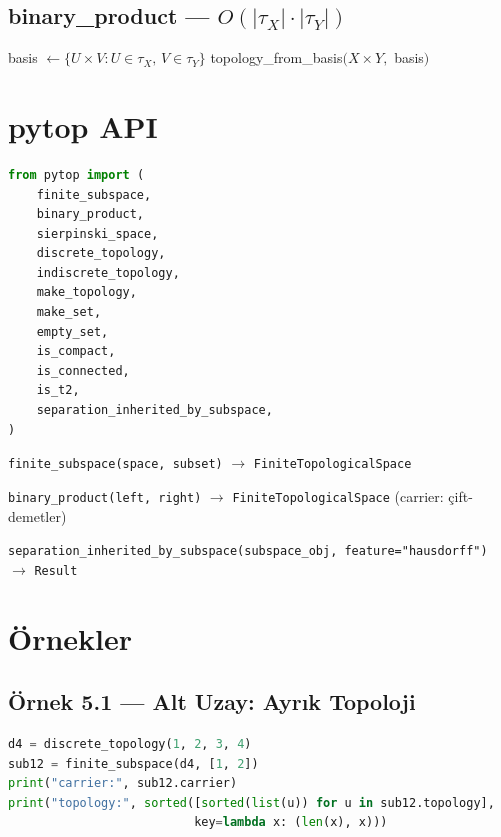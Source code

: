 \subsection{binary\_product — $O(|\tau_X| \cdot |\tau_Y|)$}

\begin{algorithm}
\caption{Product$(X, \tau_X, Y, \tau_Y)$}
\begin{algorithmic}[1]
\State basis $\leftarrow \{U \times V : U \in \tau_X,\, V \in \tau_Y\}$
\State \Return topology\_from\_basis$(X \times Y,$ basis$)$
\end{algorithmic}
\end{algorithm}

\section{pytop API}

\begin{lstlisting}[language=Python]
from pytop import (
    finite_subspace,
    binary_product,
    sierpinski_space,
    discrete_topology,
    indiscrete_topology,
    make_topology,
    make_set,
    empty_set,
    is_compact,
    is_connected,
    is_t2,
    separation_inherited_by_subspace,
)
\end{lstlisting}

\texttt{finite\_subspace(space, subset)} $\to$ \texttt{FiniteTopologicalSpace}

\texttt{binary\_product(left, right)} $\to$ \texttt{FiniteTopologicalSpace} (carrier: çift-demetler)

\texttt{separation\_inherited\_by\_subspace(subspace\_obj, feature="hausdorff")} $\to$ \texttt{Result}

\section{Örnekler}

\subsection*{Örnek 5.1 — Alt Uzay: Ayrık Topoloji}

\begin{lstlisting}[language=Python]
d4 = discrete_topology(1, 2, 3, 4)
sub12 = finite_subspace(d4, [1, 2])
print("carrier:", sub12.carrier)
print("topology:", sorted([sorted(list(u)) for u in sub12.topology],
                          key=lambda x: (len(x), x)))
\end{lstlisting}

